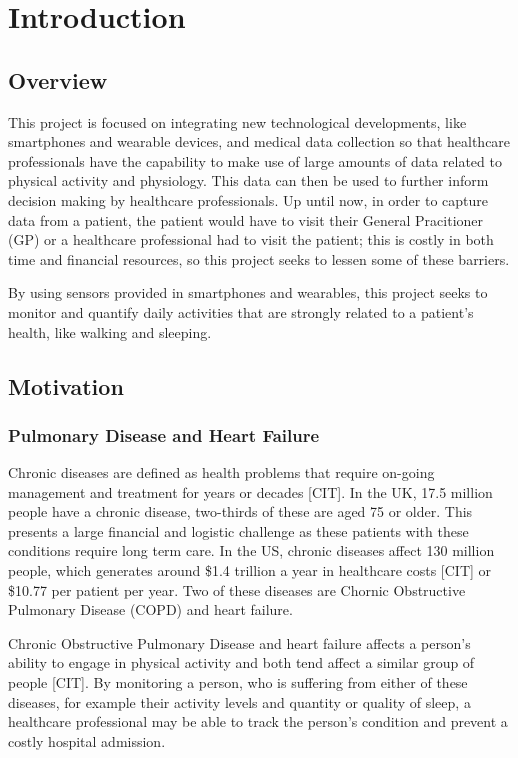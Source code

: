 \part{Introduction}

    \chapter{Overview}

        This project is focused on integrating new technological developments, like smartphones and wearable devices, and medical data collection so that healthcare professionals have the capability to make use of large amounts of data related to physical activity and physiology. This data can then be used to further inform decision making by healthcare professionals. Up until now, in order to capture data from a patient, the patient would have to visit their General Pracitioner (GP) or a healthcare professional had to visit the patient; this is costly in both time and financial resources, so this project seeks to lessen some of these barriers. 

        By using sensors provided in smartphones and wearables, this project seeks to monitor and quantify daily activities that are strongly related to a patient's health, like walking and sleeping.

    \chapter{Motivation}

        \section{Pulmonary Disease and Heart Failure}

            Chronic diseases are defined as health problems that require on-going management and treatment for years or decades [CIT]. In the UK, 17.5 million people have a chronic disease, two-thirds of these are aged 75 or older. This presents a large financial and logistic challenge as these patients with these conditions require long term care. In the US, chronic diseases affect 130 million people, which generates around \$1.4 trillion a year in healthcare costs [CIT] or \$10.77 per patient per year. Two of these diseases are Chornic Obstructive Pulmonary Disease (COPD) and heart failure. 

            Chronic Obstructive Pulmonary Disease and heart failure affects a person's ability to engage in physical activity and both tend affect a similar group of people [CIT]. By monitoring a person, who is suffering from either of these diseases, for example their activity levels and quantity or quality of sleep, a healthcare professional may be able to track the person's condition and prevent a costly hospital admission.


